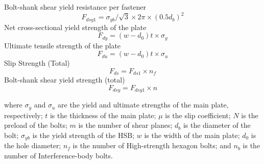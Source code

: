 Bolt-shank shear yield resistance per fastener
\begin{equation}
    \label{eq-fdsy1}
    F_{dsy1} = \sigma_{yb} / \sqrt{3} \times 2 \pi \times (0.5d_b)^2
\end{equation}
Net cross-sectional yield strength of the plate
\begin{equation}
    \label{eq-fdy}
    F_{dy} = (w-d_0)t \times \sigma_y
\end{equation}
Ultimate tensile strength of the plate
\begin{equation}
    \label{eq-fdu}
    F_{du} = (w-d_0)t \times \sigma_u
\end{equation}
Slip Strength (Total)
\begin{equation}
    \label{eq-fds}
    F_{ds} = F_{ds1} \times n_{f}
\end{equation}
Bolt-shank shear yield strength (total)
\begin{equation}
    \label{eq-fdsy}
    F_{dsy} = F_{dsy1} \times n
\end{equation}

where $\sigma_y$ and $\sigma_u$ are the yield and ultimate strengths of the main plate, respectively; $t$ is the thickness of the main plate; $\mu$ is the slip coefficient; $N$ is the preload of the bolts; $m$ is the number of shear planes; $d_b$ is the diameter of the bolt; $\sigma_{yb}$ is the yield strength of the HSB; $w$ is the width of the main plate; $d_0$ is the hole diameter; $n_{f}$ is the number of High-strength hexagon bolts; and $n_b$ is the number of Interference-body bolts.

